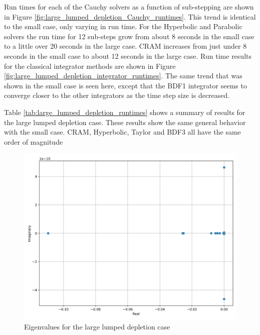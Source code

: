 Run times for each of the Cauchy solvers as a function of sub-stepping are shown in Figure \ref{fig:large_lumped_depletion_Cauchy_runtimes}. This trend is identical to the small case, only varying in run time. For the Hyperbolic and Parabolic solvers the run time for 12 sub-steps grow from about 8 seconds in the small case to a little over 20 seconds in the large case. CRAM increases from just under 8 seconds in the small case to about 12 seconds in the large case. Run time results for the classical integrator methods are shown in Figure \ref{fig:large_lumped_depletion_integrator_runtimes}. The same trend that was shown in the small case is seen here, except that the BDF1 integrator seems to converge closer to the other integrators as the time step size is decreased. 


Table \ref{tab:large_lumped_depletion_runtimes} shows a summary of results for the large lumped depletion case. These results show the same general behavior with the small case. CRAM, Hyperbolic, Taylor and BDF3 all have the same order of magnitude

\clearpage

\begin{figure}[p]
    \centering
    \includegraphics[width=5in]{images/chapter-5/caseStudies/largeLumpedDepletion/msrLumpedDepletionLargeEigenvalues.png}
    \caption{Eigenvalues for the large lumped depletion case}
    \label{fig:large_lumped_depletion_eigenvalues}
\end{figure}

\clearpage

